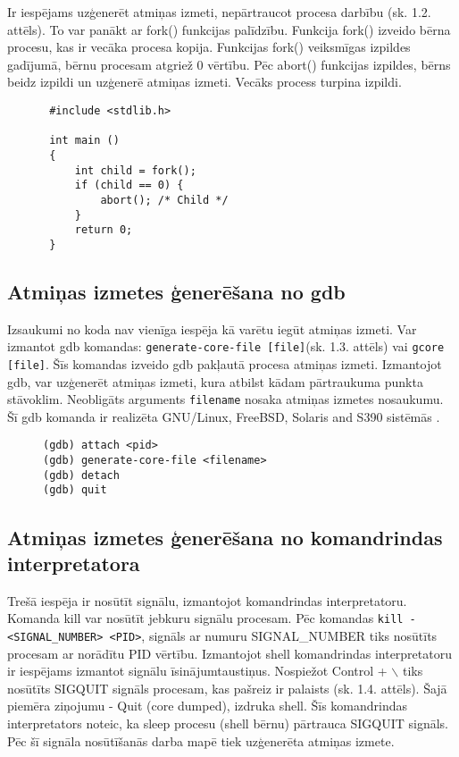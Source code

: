 Ir iespējams uzģenerēt atmiņas izmeti, nepārtraucot procesa darbību (sk. 1.2. attēls). 
To var panākt ar fork() funkcijas palīdzību. Funkcija fork() izveido bērna procesu, kas ir vecāka procesa kopija.
Funkcijas fork() veiksmīgas izpildes gadījumā, bērnu procesam atgriež 0 vērtību. 
Pēc abort() funkcijas izpildes, bērns beidz izpildi un uzģenerē atmiņas izmeti. Vecāks process turpina izpildi.


\begin{figure}[h]
\begin{lstlisting}
 #include <stdlib.h>

 int main ()
 {
     int child = fork();
     if (child == 0) {
         abort(); /* Child */
     }
     return 0;
 }
 \end{lstlisting}
\caption{\textbf{\fontsize{11}{12}\selectfont {Atmiņas izmetes ģenerēšana, turpinot procesa darbību}}}
\end{figure}

\subsection{Atmiņas izmetes ģenerēšana no gdb}
Izsaukumi no koda nav vienīga iespēja kā varētu iegūt atmiņas izmeti. 
Var izmantot gdb komandas: \texttt{generate-core-file [file]}(sk. 1.3. attēls) vai \texttt{gcore [file]}. Šīs komandas izveido gdb pakļautā procesa atmiņas izmeti. 
Izmantojot gdb, var uzģenerēt atmiņas izmeti, kura atbilst kādam pārtraukuma punkta stāvoklim. 
Neobligāts arguments \texttt{filename} nosaka atmiņas izmetes nosaukumu. Šī gdb komanda ir realizēta GNU/Linux, FreeBSD, Solaris and S390 sistēmās \cite {gdb_gen_core}.

\begin{figure}[h]
\begin{lstlisting}
(gdb) attach <pid>
(gdb) generate-core-file <filename>
(gdb) detach
(gdb) quit
 \end{lstlisting}
\caption{\textbf{\fontsize{11}{12}\selectfont {Atmiņas izmetes ģenerēšana, izmantojot gdb}}}
\end{figure}

\subsection{Atmiņas izmetes ģenerēšana no komandrindas interpretatora}
Trešā iespēja ir nosūtīt signālu, izmantojot komandrindas interpretatoru. 
Komanda kill var nosūtīt jebkuru signālu procesam.
Pēc komandas  \texttt{kill -<SIGNAL\_NUMBER> <PID>}, signāls ar numuru  SIGNAL\_NUMBER tiks nosūtīts procesam ar norādītu PID vērtību.
Izmantojot shell komandrindas interpretatoru ir  iespējams izmantot signālu īsinājumtaustiņus. 
Nospiežot Control + $\backslash$ tiks nosūtīts SIGQUIT signāls procesam, kas pašreiz ir palaists (sk. 1.4. attēls). 
Šajā piemēra ziņojumu - Quit (core dumped), izdruka shell. 
Šīs komandrindas interpretators noteic, ka  sleep procesu (shell bērnu) pārtrauca SIGQUIT signāls. 
Pēc šī signāla nosūtīšanās darba mapē tiek uzģenerēta atmiņas izmete. 

